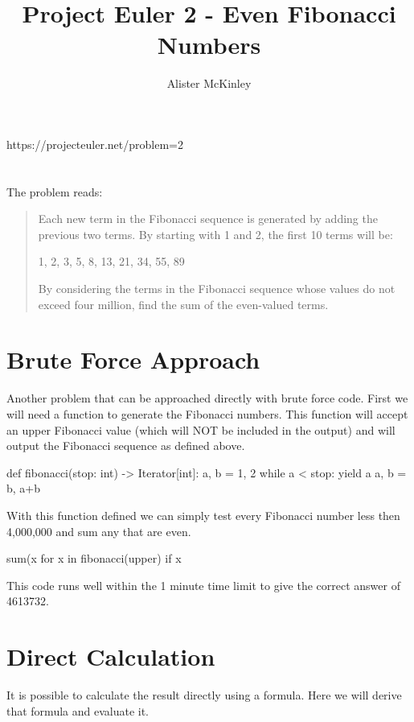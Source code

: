 \documentclass{article}
\title{Project Euler 2 - Even Fibonacci Numbers}
\author{Alister McKinley}
\date{}
\begin{document}
\maketitle
\begin{center}
    https://projecteuler.net/problem=2
\end{center}

\section*{}
The problem reads:

\begin{quote}
    Each new term in the Fibonacci sequence is generated by adding the previous
    two terms. By starting with 1 and 2, the first 10 terms will be:

    1, 2, 3, 5, 8, 13, 21, 34, 55, 89

    By considering the terms in the Fibonacci sequence whose values do not
    exceed four million, find the sum of the even-valued terms.
\end{quote}

\section*{Brute Force Approach}
Another problem that can be approached directly with brute force code. First we
will need a function to generate the Fibonacci numbers. This function will
accept an upper Fibonacci value (which will NOT be included in the output)
and will output the Fibonacci sequence as defined above.

\begin{pyverbatim}[][frame=single]
def fibonacci(stop: int) -> Iterator[int]:
    a, b = 1, 2
    while a < stop:
        yield a
        a, b = b, a+b
\end{pyverbatim}

With this function defined we can simply test every Fibonacci number less then
4,000,000 and sum any that are even.

\begin{pyverbatim}[][frame=single]
sum(x for x in fibonacci(upper) if x %
\end{pyverbatim}

This code runs well within the 1 minute time limit to give the correct answer of 4613732.

\section*{Direct Calculation}
It is possible to calculate the result directly using a formula. Here we will
derive that formula and evaluate it.
\end{document}
